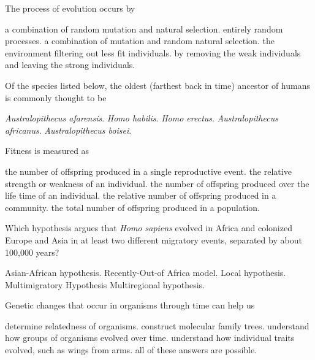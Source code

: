 \question
The process of evolution occurs by

\begin{choices}
\correctchoice a combination of random mutation and natural selection.%
\choice entirely random processes.%
\choice a combination of mutation and random natural selection.%
\choice the environment filtering out less fit individuals.%
\choice by removing the weak individuals and leaving the strong individuals.%
\end{choices}

\question
Of the species listed below, the oldest (farthest back in time) ancestor of humans is commonly thought to be

\begin{choices}
\correctchoice \textit{Australopithecus afarensis}.%
\choice \textit{Homo habilis}.%
\choice \textit{Homo erectus}.%
\choice \textit{Australopithecus africanus}.%
\choice \textit{Australopithecus boisei}.%
\end{choices}

\question
Fitness is measured as

\begin{choices}
\choice the number of offspring produced in a single reproductive event.%
\choice the relative strength or weakness of an individual.%
\correctchoice the number of offspring produced over the life time of an individual.%
\choice the relative number of offspring produced in a community.%
\choice the total number of offspring produced in a population.%
\end{choices}

\question
Which hypothesis argues that \textit{Homo sapiens} evolved in Africa and colonized Europe and Asia in at least two different migratory events, separated by about 100,000 years?

\begin{choices}
\choice Asian-African hypothesis.%
\correctchoice Recently-Out-of Africa model.%
\choice Local hypothesis.%
\choice Multimigratory Hypothesis%
\choice Multiregional hypothesis.%
\end{choices}

\question
Genetic changes that occur in organisms through time can help us

\begin{choices}
\choice determine relatedness of organisms.%
\choice construct molecular family trees.%
\choice understand how groups of organisms evolved over time.%
\choice understand how individual traits evolved, such as wings from arms.%
\correctchoice all of these answers are possible.%
\end{choices}


